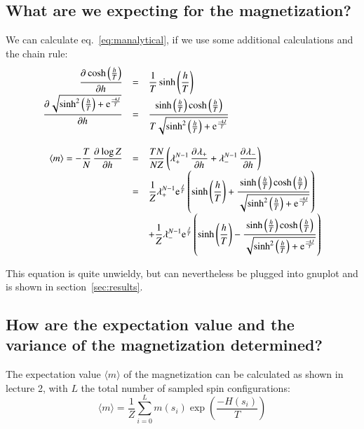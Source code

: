 \documentclass{scrartcl}
\begin{document}
\subsection{What are we expecting for the magnetization?}
\label{subsec:expectationmagnetization}
We can calculate eq.~\ref{eq:manalytical}, if we use some additional calculations and the chain rule:
\[\begin{array}{>{\displaystyle}r>{\displaystyle}c>{\displaystyle}l}
\dpd{\cosh\left( \frac{h}{T}\right)}{h}
&=&\frac{1}{T}\sinh\left( \frac{h}{T}\right)\\

\dpd{\sqrt{\sinh^2\left(\frac{h}{T} \right)+\text{e}^{\frac{-4J}{T}} }}{h}
&=&\frac{\sinh\left( \frac{h}{T}\right)\cosh\left( \frac{h}{T}\right)}
{T\sqrt{\sinh^2\left(\frac{h}{T} \right)+\text{e}^{\frac{-4J}{T}} }}\\

&&\\

\langle m\rangle =-\frac{T}{N}\dpd{\log Z}{h}
&=&\frac{TN}{NZ}\left( \lambda_+^{N-1}\dpd{\lambda_+}{h}+\lambda_-^{N-1}\dpd{\lambda_-}{h}\right) \\

&=&\frac{1}{Z} 
\lambda_+^{N-1} \text{e}^{\frac{J}{T}}
\left( \sinh\left(\frac{h}{T} \right) 
+ \frac{\sinh\left( \frac{h}{T}\right)\cosh\left( \frac{h}{T}\right)}
{\sqrt{\sinh^2\left(\frac{h}{T} \right)+\text{e}^{\frac{-4J}{T}} }} \right)\\

  
&&+\frac{1}{Z}\lambda_-^{N-1}\text{e}^{\frac{J}{T}}
\left( \sinh\left(\frac{h}{T} \right) 
- \frac{\sinh\left( \frac{h}{T}\right)\cosh\left( \frac{h}{T}\right)}
{\sqrt{\sinh^2\left(\frac{h}{T} \right)+\text{e}^{\frac{-4J}{T}} }} \right)

\end{array}\]

This equation is quite unwieldy, but can nevertheless be plugged into gnuplot and is shown in section~\ref{sec:results}.
	
\subsection{How are the expectation value and the variance of the magnetization determined?}

The expectation value $\langle m\rangle$ of the magnetization can be calculated as shown in lecture 2, with $L$ the total number of sampled spin configurations: 
\[\langle m\rangle=\frac{1}{Z}\sum_{i=0}^{L}m(s_i)\exp\left( \frac{-H(s_i)}{T}\right) \]
\end{document}
